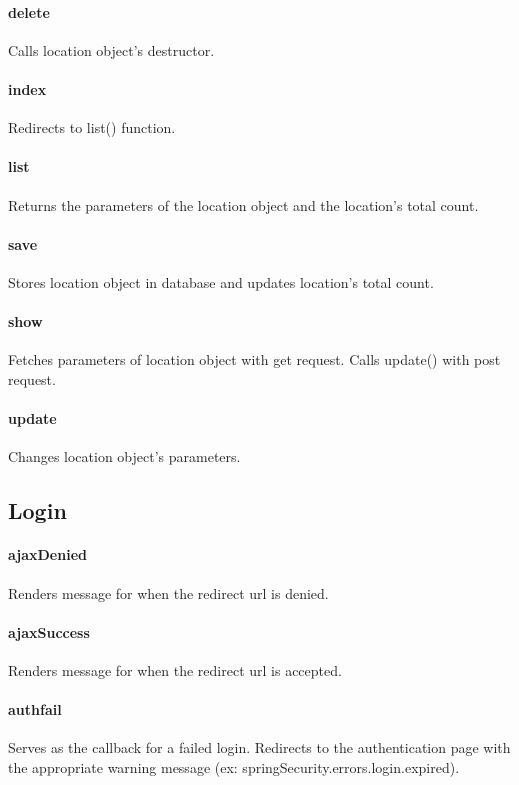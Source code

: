 \documentclass[12pt]{article}
\begin{document}
\paragraph{delete} Calls location object's destructor.
\paragraph{index} Redirects to list() function.
\paragraph{list} Returns the parameters of the location object and the location's total count.
\paragraph{save} Stores location object in database and updates location's total count.
\paragraph{show} Fetches parameters of location object with get request. Calls update() with post request.
\paragraph{update} Changes location object's parameters.

\subsection{Login}\label{sec:CLogin}
\paragraph{ajaxDenied} Renders message for when the redirect url is denied.
\paragraph{ajaxSuccess} Renders message for when the redirect url is accepted.
\paragraph{authfail} Serves as the callback for a failed login. Redirects to the authentication page with the appropriate warning message (ex: springSecurity.errors.login.expired).
\end{document}
